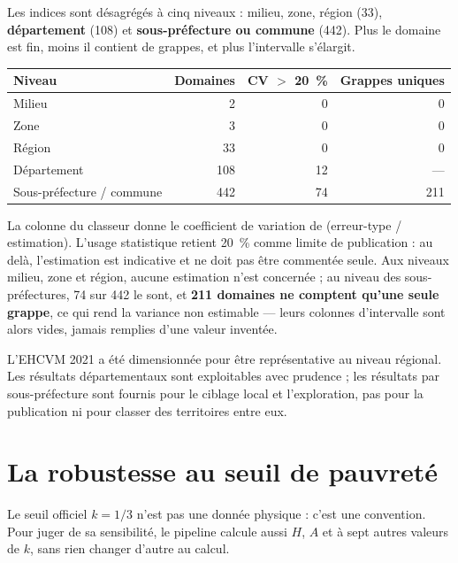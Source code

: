 \documentclass[11pt,a4paper]{article}
\begin{document}
Les indices sont désagrégés à cinq niveaux : milieu, zone, région (33),
\textbf{département} (108) et \textbf{sous-préfecture ou commune} (442). Plus le domaine est fin,
moins il contient de grappes, et plus l'intervalle s'élargit.

\begin{center}
\begin{tabular}{@{}lrrr@{}}
\toprule
\textbf{Niveau} & \textbf{Domaines} & \textbf{CV $>$ 20~\%} & \textbf{Grappes uniques} \\
\midrule
Milieu & 2 & 0 & 0 \\
Zone & 3 & 0 & 0 \\
Région & 33 & 0 & 0 \\
Département & 108 & 12 & --- \\
Sous-préfecture / commune & 442 & 74 & 211 \\
\bottomrule
\end{tabular}
\end{center}

La colonne  du classeur donne le coefficient de variation de \ipm{}
(erreur-type / estimation). L'usage statistique retient 20~\% comme limite de publication : au
delà, l'estimation est indicative et ne doit pas être commentée seule. Aux niveaux milieu, zone
et région, aucune estimation n'est concernée ; au niveau des sous-préfectures, 74 sur 442 le
sont, et \textbf{211 domaines ne comptent qu'une seule grappe}, ce qui rend la variance non
estimable --- leurs colonnes d'intervalle sont alors vides, jamais remplies d'une valeur
inventée.

\begin{attention}
L'EHCVM 2021 a été dimensionnée pour être représentative au niveau régional. Les résultats
départementaux sont exploitables avec prudence ; les résultats par sous-préfecture sont fournis
pour le ciblage local et l'exploration, pas pour la publication ni pour classer des territoires
entre eux.
\end{attention}

\section{La robustesse au seuil de pauvreté}

Le seuil officiel $k = 1/3$ n'est pas une donnée physique : c'est une convention. Pour juger de
sa sensibilité, le pipeline calcule aussi $H$, $A$ et \ipm{} à sept autres valeurs de $k$, sans
rien changer d'autre au calcul.
\end{document}
